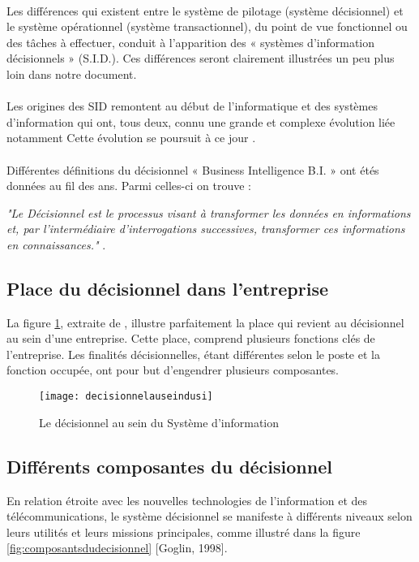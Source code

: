 \paragraph{}
Les différences qui existent entre le système de pilotage (système décisionnel) et le système opérationnel (système transactionnel), du point de vue fonctionnel ou des tâches à effectuer, conduit à l’apparition des « systèmes d’information décisionnels » (S.I.D.). Ces différences seront clairement illustrées un peu plus loin dans notre document.
\paragraph{}

Les origines des SID remontent au début de l’informatique et des systèmes d’information
qui ont, tous deux, connu une grande et complexe évolution liée notamment Cette évolution se poursuit à ce jour \cite{book:1}.
\paragraph{}
Différentes définitions du décisionnel « Business Intelligence B.I. » ont étés données au fil des ans. Parmi celles-ci on trouve : 

\textit{"Le Décisionnel est le processus visant à transformer les données en informations et,
par l'intermédiaire d'interrogations successives, transformer ces informations en
connaissances."} \cite{book:2}.

\subsection{Place du décisionnel dans l’entreprise}
La figure \ref{fig:decisionnelauseindusi}, extraite de \cite{book:4}, illustre parfaitement la place qui revient au décisionnel au sein d’une entreprise. Cette place, comprend plusieurs fonctions clés de l’entreprise. Les finalités décisionnelles, étant différentes selon le poste et la fonction occupée, ont pour but d’engendrer plusieurs composantes.

\begin{figure}[H]
    \centering
    \texttt{[image: decisionnelauseindusi]}
    \caption{Le décisionnel au sein du Système d’information}
    \label{fig:decisionnelauseindusi}
\end{figure}

\subsection{Différents composantes du décisionnel}
En relation étroite avec les nouvelles technologies de l’information et des télécommunications, le système décisionnel se manifeste à différents niveaux selon leurs utilités et leurs missions principales, comme illustré dans la figure \ref{fig:composantsdudecisionnel} [Goglin, 1998].

